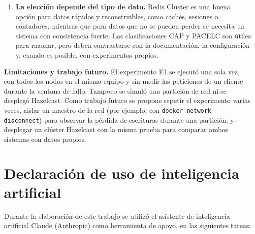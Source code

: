 \documentclass[11pt,a4paper]{article}
\begin{document}
\begin{enumerate}
  \item \textbf{La elección depende del tipo de dato.} Redis Cluster es una
  buena opción para datos rápidos y reconstruibles, como cachés, sesiones o
  contadores, mientras que para datos que no se pueden perder se necesita un
  sistema con consistencia fuerte. Las clasificaciones CAP y PACELC son
  útiles para razonar, pero deben contrastarse con la documentación, la
  configuración y, cuando es posible, con experimentos propios.
\end{enumerate}

\textbf{Limitaciones y trabajo futuro.} El experimento E1 se ejecutó una sola
vez, con todos los nodos en el mismo equipo y sin medir las peticiones de un
cliente durante la ventana de fallo. Tampoco se simuló una partición de red
ni se desplegó Hazelcast. Como trabajo futuro se propone repetir el
experimento varias veces, aislar un maestro de la red (por ejemplo, con
\texttt{docker network disconnect}) para observar la pérdida de escrituras
durante una partición, y desplegar un clúster Hazelcast con la misma prueba
para comparar ambos sistemas con datos propios.


\section*{Declaración de uso de inteligencia artificial}

Durante la elaboración de este trabajo se utilizó el asistente de
inteligencia artificial Claude (Anthropic) como herramienta de apoyo, en las
siguientes tareas:
\end{document}
